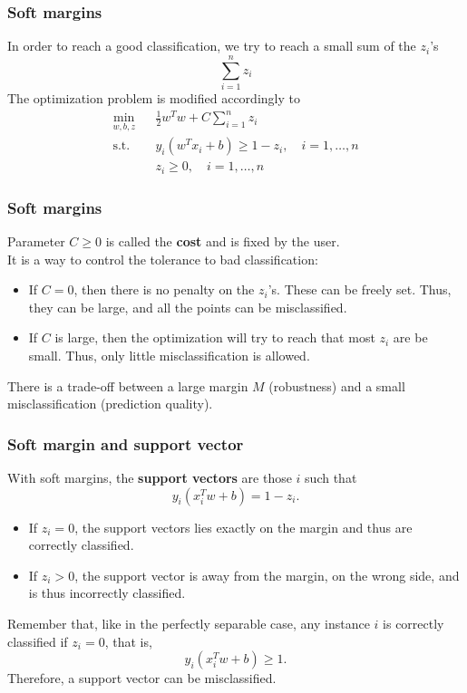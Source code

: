 \begin{frame}
\frametitle{Soft margins}
In order to reach a good classification, we try to reach a small sum of the $z_i$'s 
$$
\sum_{i=1}^n z_i
$$ 
The optimization problem is modified accordingly to
\begin{eqnarray}
\label{SVM_Primal}
\nonumber \min_{w, b, z} && \frac{1}{2}w^Tw + C\sum_{i=1}^n z_i  \\
\mbox{s.t. } && y_i(w^Tx_i + b) \geq 1-z_i, \quad i=1,\ldots ,n\\
\nonumber && z_i\geq 0, \quad i=1,\ldots ,n
\end{eqnarray}
\end{frame}
\begin{frame}
\frametitle{Soft margins}
Parameter $C\geq 0$ is called the {\bf cost} and is fixed by the user.\\
\vspace{0.3cm} 
It is a way to control the tolerance to bad classification:
\begin{itemize}
\item If $C=0$, then there is no penalty on the $z_i$'s. These can be freely set. Thus, they can be large, and all the points can be misclassified.
\item If $C$ is large, then the optimization will try to reach that most $z_i$ are be small. Thus, only little misclassification is allowed. 
\end{itemize}
There is a trade-off between a large margin $M$ (robustness) and a small misclassification (prediction quality).
\end{frame}
\begin{frame}
\frametitle{Soft margin and support vector}
With soft margins, the {\bf support vectors} are those $i$ such that
$$
y_i (x_i^Tw + b) = 1-z_i.
$$
\begin{itemize}
\item If $z_i=0$, the support vectors lies exactly on the margin and thus are correctly classified.\\
\item If $z_i > 0$, the support vector is away from the margin, on the wrong side, and is thus incorrectly classified.
\end{itemize} 
Remember that, like in the perfectly separable case, any instance $i$ is correctly classified if $z_i=0$, that is, 
$$
y_i (x_i^Tw + b) \geq 1.
$$
Therefore, a support vector can be misclassified.
\end{frame}
